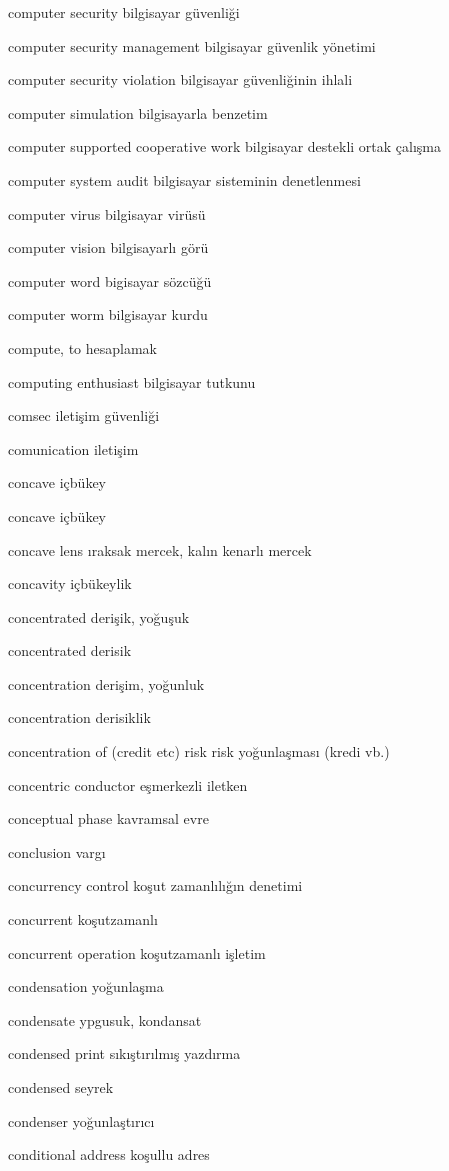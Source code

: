 \documentclass[12pt,fleqn]{article}\usepackage{../../common}
\begin{document}
computer security bilgisayar güvenliği

computer security management bilgisayar güvenlik yönetimi

computer security violation bilgisayar güvenliğinin ihlali

computer simulation bilgisayarla benzetim

computer supported cooperative work bilgisayar destekli ortak çalışma

computer system audit bilgisayar sisteminin denetlenmesi

computer virus bilgisayar virüsü

computer vision bilgisayarlı görü

computer word bigisayar sözcüğü

computer worm bilgisayar kurdu

compute, to hesaplamak

computing enthusiast bilgisayar tutkunu

comsec iletişim güvenliği

comunication iletişim

concave içbükey

concave içbükey

concave lens ıraksak mercek, kalın kenarlı mercek

concavity içbükeylik

concentrated derişik, yoğuşuk

concentrated derisik

concentration derişim, yoğunluk

concentration derisiklik

concentration of (credit etc) risk risk yoğunlaşması (kredi vb.)

concentric conductor eşmerkezli iletken

conceptual phase kavramsal evre

conclusion vargı

concurrency control koşut zamanlılığın denetimi

concurrent koşutzamanlı

concurrent operation koşutzamanlı işletim

condensation yoğunlaşma

condensate ypgusuk, kondansat

condensed print sıkıştırılmış yazdırma

condensed seyrek

condenser yoğunlaştırıcı

conditional address koşullu adres
\end{document}
